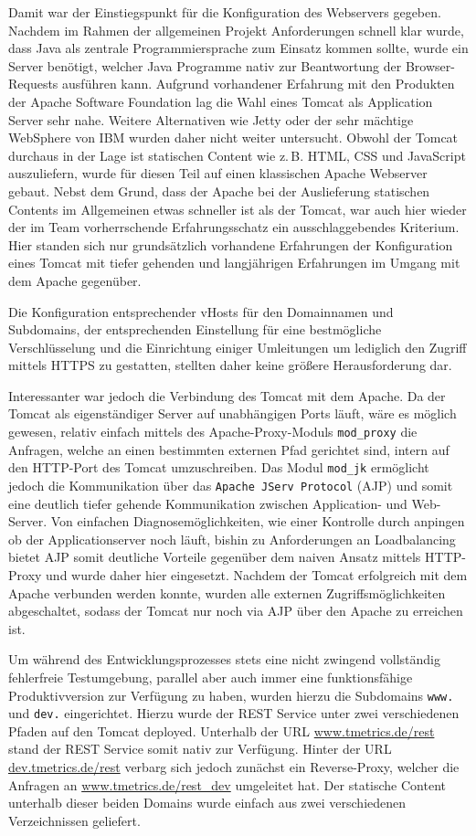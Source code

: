 Damit war der Einstiegspunkt für die Konfiguration des Webservers gegeben. Nachdem im Rahmen der allgemeinen Projekt Anforderungen schnell klar wurde, dass Java als zentrale Programmiersprache zum Einsatz kommen sollte, wurde ein Server benötigt, welcher Java Programme nativ zur Beantwortung der Browser-Requests ausführen kann. Aufgrund vorhandener Erfahrung mit den Produkten der Apache Software Foundation lag die Wahl eines Tomcat als Application Server sehr nahe. Weitere Alternativen wie Jetty oder der sehr mächtige WebSphere von IBM wurden daher nicht weiter untersucht.
Obwohl der Tomcat durchaus in der Lage ist statischen Content wie z.\,B. HTML, CSS und JavaScript auszuliefern, wurde für diesen Teil auf einen klassischen Apache Webserver gebaut.
Nebst dem Grund, dass der Apache bei der Auslieferung statischen Contents im Allgemeinen etwas schneller ist als der Tomcat, war auch hier wieder der im Team vorherrschende Erfahrungsschatz ein ausschlaggebendes Kriterium. Hier standen sich nur grundsätzlich vorhandene Erfahrungen der Konfiguration eines Tomcat mit tiefer gehenden und langjährigen Erfahrungen im Umgang mit dem Apache gegenüber.

Die Konfiguration entsprechender vHosts für den Domainnamen und Subdomains, der entsprechenden Einstellung für eine bestmögliche Verschlüsselung und die Einrichtung einiger Umleitungen um lediglich den Zugriff mittels HTTPS zu gestatten, stellten daher keine größere Herausforderung dar.

Interessanter war jedoch die Verbindung des Tomcat mit dem Apache. Da der Tomcat als eigenständiger Server auf unabhängigen Ports läuft, wäre es möglich gewesen, relativ einfach mittels des Apache-Proxy-Moduls \texttt{mod\_proxy} die Anfragen, welche an einen bestimmten externen Pfad gerichtet sind, intern auf den HTTP-Port des Tomcat umzuschreiben. 
Das Modul \texttt{mod\_jk} ermöglicht jedoch die Kommunikation über das \texttt{Apache JServ Protocol} (AJP) und somit eine deutlich tiefer gehende Kommunikation zwischen Application- und Web-Server. Von einfachen Diagnosemöglichkeiten, wie einer Kontrolle durch anpingen ob der Applicationserver noch läuft, bishin zu Anforderungen an Loadbalancing bietet AJP somit deutliche Vorteile gegenüber dem naiven Ansatz mittels HTTP-Proxy und wurde daher hier eingesetzt.
Nachdem der Tomcat erfolgreich mit dem Apache verbunden werden konnte, wurden alle externen Zugriffsmöglichkeiten abgeschaltet, sodass der Tomcat nur noch via AJP über den Apache zu erreichen ist.

Um während des Entwicklungsprozesses stets eine nicht zwingend vollständig fehlerfreie Testumgebung, parallel aber auch immer eine funktionsfähige Produktivversion zur Verfügung zu haben, wurden hierzu die Subdomains \texttt{www.} und \texttt{dev.} eingerichtet. Hierzu wurde der REST Service unter zwei verschiedenen Pfaden auf den Tomcat deployed. Unterhalb der URL \url{www.tmetrics.de/rest} stand der REST Service somit nativ zur Verfügung. Hinter der URL \url{dev.tmetrics.de/rest} verbarg sich jedoch zunächst ein Reverse-Proxy, welcher die Anfragen an \url{www.tmetrics.de/rest_dev} umgeleitet hat. Der statische Content unterhalb dieser beiden Domains wurde einfach aus zwei verschiedenen Verzeichnissen geliefert.

